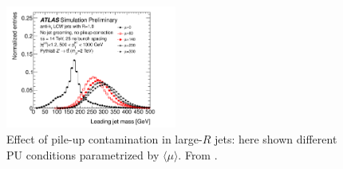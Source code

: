 \begin{figure}[!ht]
  \centering
      \includegraphics[width=0.5\textwidth]{jet_part/Jet_ungroomed_mass_pt_500.png}
  \caption[Effect of pile-up contamination]{Effect of pile-up contamination in large-$R$ jets: here shown different PU conditions parametrized by $\langle\mu\rangle$. From \cite{highlumi}.}
  \label{fig:largejetpu}
\end{figure}


